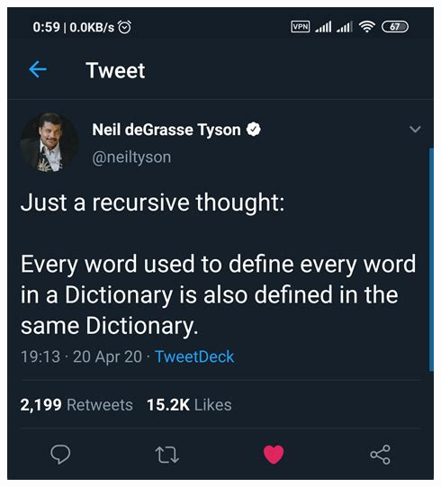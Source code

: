 \documentclass[letterpaper, 10pt]{article}
\begin{document}
\\
\begin{center}
    \includegraphics[scale=0.35]{images/recursions_joke.jpg}
\end{center}
\end{document}
